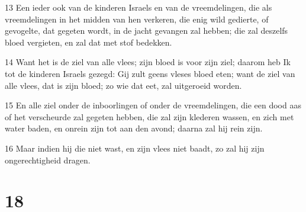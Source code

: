\par 13 Een ieder ook van de kinderen Israels en van de vreemdelingen, die als vreemdelingen in het midden van hen verkeren, die enig wild gedierte, of gevogelte, dat gegeten wordt, in de jacht gevangen zal hebben; die zal deszelfs bloed vergieten, en zal dat met stof bedekken.
\par 14 Want het is de ziel van alle vlees; zijn bloed is voor zijn ziel; daarom heb Ik tot de kinderen Israels gezegd: Gij zult geens vleses bloed eten; want de ziel van alle vlees, dat is zijn bloed; zo wie dat eet, zal uitgeroeid worden.
\par 15 En alle ziel onder de inboorlingen of onder de vreemdelingen, die een dood aas of het verscheurde zal gegeten hebben, die zal zijn klederen wassen, en zich met water baden, en onrein zijn tot aan den avond; daarna zal hij rein zijn.
\par 16 Maar indien hij die niet wast, en zijn vlees niet baadt, zo zal hij zijn ongerechtigheid dragen.

\chapter{18}

